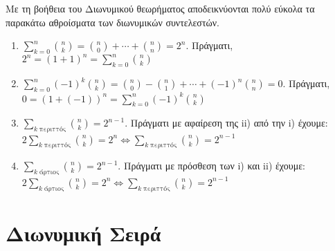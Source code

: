 \documentclass[a4paper,table]{report}
\begin{document}
Με τη βοήθεια του Διωνυμικού θεωρήματος αποδεικνύονται πολύ εύκολα τα παρακάτω 
αθροίσματα των διωνυμικών συντελεστών.
\begin{prop}
\item {}
  \begin{enumerate}
    \item $ \sum_{k=0}^{n} \binom{n}{k} = \binom{n}{0} +\cdots+ \binom{n}{n} =  2^{n} $. 
      Πράγματι, $ 2^{n}=(1+1)^{n} =
      \sum_{k=0}^{n} \binom{n}{k} $
    \item $ \sum_{k=0}^{n} (-1)^k \binom{n}{k} = \binom{n}{0} - \binom{n}{1} +\cdots
      +(-1)^{n} \binom{n}{n} = 0 $. Πράγματι, $ 0 = (1+(-1))^{n} = 
      \sum_{k=0}^{n} (-1)^{k}\binom{n}{k} $
    \item $ \sum_{k \; \text{περιττός}} \binom{n}{k} = 2^{n-1} $. 
      Πράγματι με αφαίρεση της ii) από την i) έχουμε: $ 2 \sum_{k \; \text{περιττός}} 
      \binom{n}{k} = 2^{n} \Leftrightarrow \sum_{k \; \text{περιττός}}
      \binom{n}{k} = 2^{n-1} $
    \item $ \sum_{k \; \text{άρτιος}} \binom{n}{k} = 2^{n-1} $. 
      Πράγματι με πρόσθεση των i) και ii) έχουμε: $ 2 \sum_{k \; \text{άρτιος}}
      \binom{n}{k} = 2^{n} \Leftrightarrow \sum_{k \; \text{περιττός}} \binom{n}{k}
      = 2^{n-1} $
  \end{enumerate}
\end{prop}



\section*{Διωνυμική Σειρά}
\end{document}
